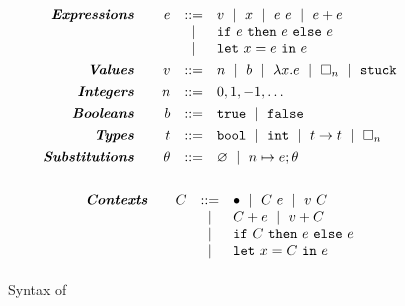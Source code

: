 \begin{figure}
$$
\begin{array}{rrcl}
\emphbf{Expressions} \quad 
  & e & ::=    & v \spmid x \spmid \eapp{e}{e} \spmid \eplus{e}{e}\\
  &   & \spmid & \eif{e}{e}{e} \\
  &   & \spmid & \elet{x}{e}{e} \\[0.05in] 

\emphbf{Values} \quad 
  & v & ::= &  n \spmid b \spmid \efun{x}{e} \spmid \ehole{n} \spmid \stuck \\[0.05in] 

\emphbf{Integers} \quad
  & n & ::= &  0,1,-1,\ldots \\[0.05in]

\emphbf{Booleans} \quad
  & b & ::= &  \etrue \spmid \efalse \\[0.05in]

\emphbf{Types} \quad 
  & t & ::= & \tbool \spmid \tint \spmid \tfun{t}{t} \spmid \thole{n} \\[0.05in]

\emphbf{Substitutions} \quad
  & \su & ::= & \emptysu \spmid \mksub{n}{e}; \su \\[0.1in]
\end{array}
$$

$$
\begin{array}{rrcl}
\textbf{\emph{Contexts}} \quad 
  & C
  & ::= 
  &   	 \bullet 
  \ \mid \  C \ e
  \ \mid \  v \ C \\
  & & \ \mid \  & C + e \ \mid \  v + C \\
  & & \ \mid \  & \mathtt{if}\ C\ \mathtt{then}\ e\ \mathtt{else}\ e \\
  & & \ \mid \  & \mathtt{let}\ x = C\ \mathtt{in}\ e
  \\[0.05in] 
\end{array}
$$



\caption{Syntax of \lang {}}
\label{fig:syntax}
\end{figure}

